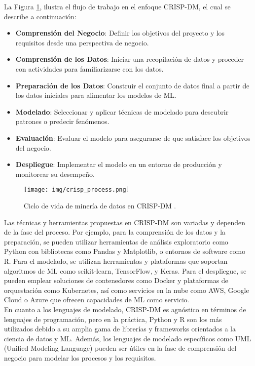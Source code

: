 \documentclass[journal]{IEEEtran}
\begin{document}
La Figura \ref{fig:cripsDM}, ilustra el flujo de trabajo en el enfoque CRISP-DM, el cual se describe a continuación:\\

\begin{itemize}
    \item \textbf{Comprensión del Negocio}: Definir los objetivos del proyecto y los requisitos desde una perspectiva de negocio.
    \item \textbf{Comprensión de los Datos}: Iniciar una recopilación de datos y proceder con actividades para familiarizarse con los datos.
    \item \textbf{Preparación de los Datos}: Construir el conjunto de datos final a partir de los datos iniciales para alimentar los modelos de ML.
    \item \textbf{Modelado}: Seleccionar y aplicar técnicas de modelado para descubrir patrones o predecir fenómenos.
    \item \textbf{Evaluación}: Evaluar el modelo para asegurarse de que satisface los objetivos del negocio.
    \item \textbf{Despliegue}: Implementar el modelo en un entorno de producción y monitorear su desempeño.\\
\end{itemize}

\begin{figure}[h!]
    \centering
    \texttt{[image: img/crisp\_process.png]}
    \caption{Ciclo de vida de minería de datos en CRISP-DM \cite{ibmConceptosBxE1sicos}.}
    \label{fig:cripsDM}
\end{figure}

Las técnicas y herramientas propuestas en CRISP-DM son variadas y dependen de la fase del proceso. Por ejemplo, para la comprensión de los datos y la preparación, se pueden utilizar herramientas de análisis exploratorio como Python con bibliotecas como Pandas y Matplotlib, o entornos de software como R. Para el modelado, se utilizan herramientas y plataformas que soportan algoritmos de ML como scikit-learn, TensorFlow, y Keras. Para el despliegue, se pueden emplear soluciones de contenedores como Docker y plataformas de orquestación como Kubernetes, así como servicios en la nube como AWS, Google Cloud o Azure que ofrecen capacidades de ML como servicio.\\

En cuanto a los lenguajes de modelado, CRISP-DM es agnóstico en términos de lenguajes de programación, pero en la práctica, Python y R son los más utilizados debido a su amplia gama de librerías y frameworks orientados a la ciencia de datos y ML. Además, los lenguajes de modelado específicos como UML (Unified Modeling Language) pueden ser útiles en la fase de comprensión del negocio para modelar los procesos y los requisitos.\\
\end{document}
